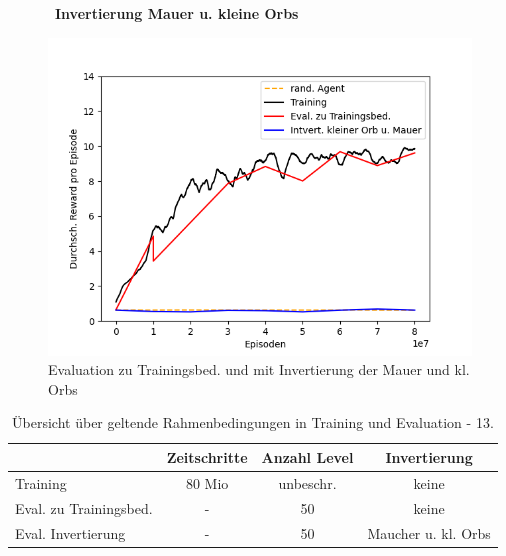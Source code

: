 \begin{figure}[htp!]
   \centering
   \captionsetup{width=0.60\linewidth} 
    \begin{minipage}{0.48\linewidth}
        \centering\
        \textbf{Invertierung Mauer u. kleine Orbs}\par\medskip
        \includegraphics[scale=0.5]{abb/_graphen/semChange_mauerklOrb_80Mio_15act_training_}
        \caption{Evaluation zu Trainingsbed. und mit Invertierung der Mauer und kl. Orbs}
        \label{fig:semChange_mauerklOrb_80Mio_15act_training_}
    \end{minipage}
\end{figure}
\begin{center}
 \begin{table}[htp!]
 \begin{center}
  \begin{tabular}{ l c c c }
    \hline
		               			& Zeitschritte & Anzahl Level & 	 Invertierung\\ \hline
     Training              			& 80 Mio       & unbeschr.	    & 	 keine \\ \hline
     Eval. zu Trainingsbed.		& -	        	     & 50		    &	 keine \\ \hline
     Eval. Invertierung		 	& -	        	     & 50		    &	 Maucher u. kl. Orbs \\ \hline
    \hline
  \end{tabular}
  \caption{Übersicht über geltende Rahmenbedingungen in Training und Evaluation - 13.}
  \label{tab:tab_durch_EXP_trainSetting13}
  \end{center}
 \end{table}
\end{center} 

